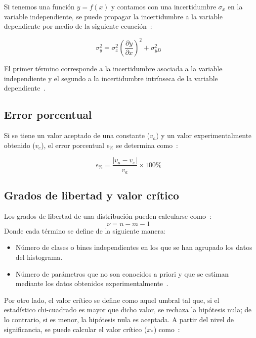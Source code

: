 \documentclass[twocolumn]{article} %
\begin{document}
Si tenemos una función $y=f(x)$ y contamos con una incertidumbre $\sigma_x$ en la variable independiente, se puede propagar la incertidumbre a la variable dependiente por medio de la siguiente ecuación~\cite{bevington2003data}:

\begin{equation}
    \sigma_y^2 = \sigma_x^2 \left( \frac{\partial y}{\partial x} \right)^2 + \sigma_{yD}^2
\end{equation}

El primer término corresponde a la incertidumbre asociada a la variable independiente y el segundo a la incertidumbre intrínseca de la variable dependiente~\cite{bevington2003data}.

\subsection{Error porcentual }
Si se tiene un valor aceptado de una constante ($v_a$) y un valor experimentalmente obtenido ($v_e$), el error porcentual $\epsilon_{\%}$ se determina como~\cite{JCGM2008}:

\begin{equation}
    \epsilon_{\%} = \frac{|v_a - v_e|}{v_a} \times 100\%
\end{equation}
\subsection{Grados de libertad y valor crítico}
Los grados de libertad de una distribución pueden calcularse como~\cite{sirca2016probability}:
\begin{equation}
    \nu = n - m - 1 
    \label{nu}
\end{equation}
Donde cada término se define de la siguiente manera:

\begin{itemize}
    \item[$n$:] Número de clases o bines independientes en los que se han agrupado los datos del histograma.
    \item[$m$:] Número de parámetros que no son conocidos a priori y que se estiman mediante los datos obtenidos experimentalmente~\cite{sirca2016probability}.
\end{itemize}

Por otro lado, el valor crítico se define como aquel umbral tal que, si el estadístico chi-cuadrado es mayor que dicho valor, se rechaza la hipótesis nula; de lo contrario, si es menor, la hipótesis nula es aceptada. A partir del nivel de significancia, se puede calcular el valor crítico ($x_*$) como~\cite{sirca2016probability}:
\end{document}
